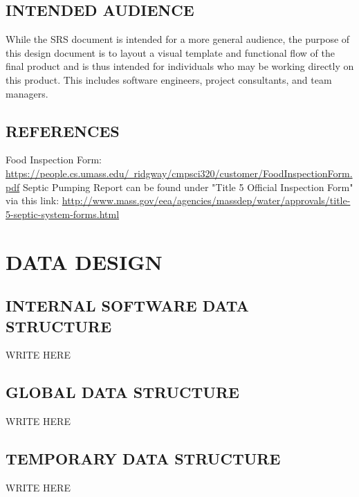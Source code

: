 \documentclass[twoside,letterpaper]{article}
\begin{document}
\subsection[INTENDED AUDIENCE]{\rmfamily\bfseries\color{black}
INTENDED AUDIENCE}
{\rmfamily\color{black}
While the SRS document is intended for a more general audience, the purpose of this design document is to layout a visual template and functional flow of the final product and is thus intended for individuals who may be working directly on this product. This includes software engineers, project consultants, and team managers. 
}

\subsection[REFERENCES]{\rmfamily\bfseries\color{black}
REFERENCES}
{\rmfamily\color{black}
Food Inspection Form: 
\hyperref[]{https://people.cs.umass.edu/~ridgway/cmpsci320/customer/FoodInspectionForm.pdf}
Septic Pumping Report can be found under "Title 5 Official Inspection Form" via this link: 
\hyperref[]{http://www.mass.gov/eea/agencies/massdep/water/approvals/title-5-septic-system-forms.html}
}


\clearpage\section[DATA DESIGN]{\rmfamily\bfseries\color{black}
DATA DESIGN}
\subsection[INTERNAL SOFTWARE DATA STRUCTURE]{\rmfamily\bfseries\color{black}
INTERNAL SOFTWARE DATA STRUCTURE}
{\rmfamily\color{black}
WRITE HERE}

\subsection[GLOBAL DATA STRUCTURE]{\rmfamily\bfseries\color{black}
GLOBAL DATA STRUCTURE}
{\rmfamily\color{black}
WRITE HERE}

\subsection[TEMPORARY DATA STRUCTURE]{\rmfamily\bfseries\color{black}
TEMPORARY DATA STRUCTURE}
{\rmfamily\color{black}
WRITE HERE}
\end{document}
